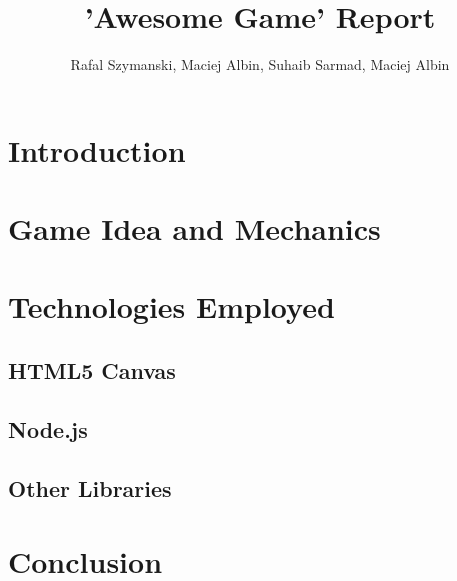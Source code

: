 \documentclass[a4paper,11pt]{article}
\title{'Awesome Game' Report}
\author{Rafal Szymanski, Maciej Albin, Suhaib Sarmad, Maciej Albin}
\begin{document}
 
	\maketitle
	
	\section{Introduction}
	
	\section{Game Idea and Mechanics}
	
	\section{Technologies Employed}
		
		\subsection{HTML5 Canvas}
		
		\subsection{Node.js}
		
		\subsection{Other Libraries}
		
	\section{Conclusion}
	
	
\end{document}
